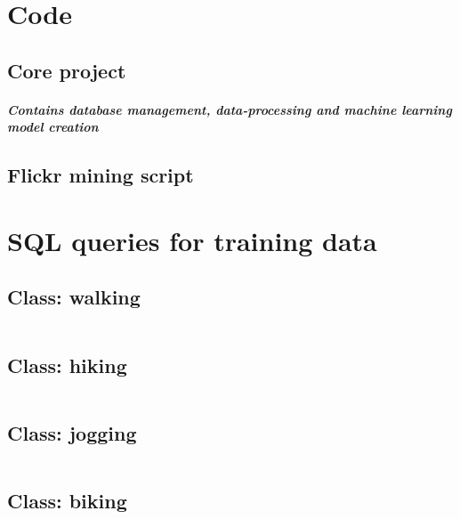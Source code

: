 \appendix

\chapter{Code} \label{python_code}

\section{Core project}
\paragraph*{Contains database management, data-processing and machine learning model creation}
\clearpage

\section{Flickr mining script}
\clearpage


\chapter{SQL queries for training data} \label{sql_queries_for_trainingdata}

\section{Class: walking}

\inputminted[linenos]{sql}{code/walking.txt}
\clearpage

\section{Class: hiking}

\inputminted[linenos]{sql}{code/hiking.txt}
\clearpage

\section{Class: jogging}

\inputminted[linenos]{sql}{code/jogging.txt}
\clearpage

\section{Class: biking}

